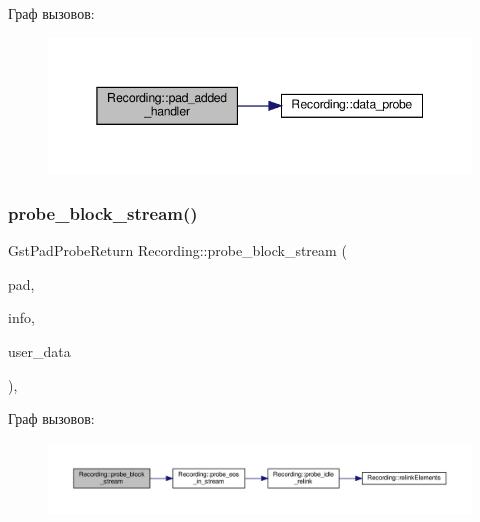 Граф вызовов\+:\nopagebreak
\begin{figure}[H]
\begin{center}
\leavevmode
\includegraphics[width=345pt]{class_recording_abea9877130d33f18639df0544497d473_cgraph}
\end{center}
\end{figure}
\mbox{\label{class_recording_a60c63e897855daf4532e7a03c8a37026}} 
\subsubsection{\texorpdfstring{probe\+\_\+block\+\_\+stream()}{probe\_block\_stream()}}
{\footnotesize\ttfamily Gst\+Pad\+Probe\+Return Recording\+::probe\+\_\+block\+\_\+stream (\begin{DoxyParamCaption}\item[{Gst\+Pad $\ast$}]{pad,  }\item[{Gst\+Pad\+Probe\+Info $\ast$}]{info,  }\item[{gpointer}]{user\+\_\+data }\end{DoxyParamCaption})\hspace{0.3cm}{\ttfamily [static]}, {\ttfamily [private]}}

Граф вызовов\+:\nopagebreak
\begin{figure}[H]
\begin{center}
\leavevmode
\includegraphics[width=350pt]{class_recording_a60c63e897855daf4532e7a03c8a37026_cgraph}
\end{center}
\end{figure}
\mbox{\label{class_recording_a235992b4e8c358b6a648d84ed1e69969}} 
